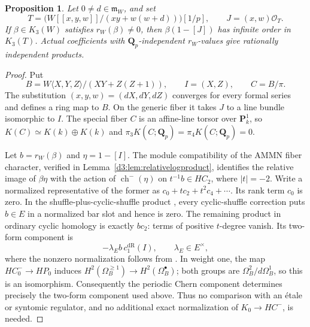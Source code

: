 \documentclass[11pt,a4paper]{amsart}
\numberwithin{equation}{section}
\newtheorem{proposition}[theorem]{Proposition}
\theoremstyle{definition}
\theoremstyle{remark}
\begin{document}
\begin{proposition}\label{d3:prop:directtccoefficientcup}
Let $0\ne d\in\mathfrak m_W$, and set
\[
 T=\bigl(W[[x,y,w]]/(xy+w(w+d))\bigr)[1/p],\qquad J=(x,w)\mathcal O_T.
\]
If $\beta\in K_3(W)$ satisfies $r_W(\beta)\ne0$, then
$\beta(1-[J])$ has infinite order in $K_3(T)$. Actual coefficients
with $\mathbf Q_p$-independent $r_W$-values give rationally independent
products.
\end{proposition}
\begin{proof}
Put
\[
 B=W\langle X,Y,Z\rangle/(XY+Z(Z+1)),\qquad I=(X,Z),\qquad C=B/\pi.
\]
The substitution $(x,y,w)=(dX,dY,dZ)$ converges for every formal
series and defines a ring map to $B$. On the generic fiber it takes
$J$ to a line bundle isomorphic to $I$. The special fiber $C$ is an
affine-line torsor over $\mathbf P^1_k$, so
$K(C)\simeq K(k)\oplus K(k)$ and
$\pi_3K(C;\mathbf Q_p)=\pi_4K(C;\mathbf Q_p)=0$.

Let $b=r_W(\beta)$ and $\eta=1-[I]$. The module compatibility of the
AMMN fiber character, verified in Lemma~\ref{d3:lem:relativelogproduct},
identifies the relative image of $\beta\eta$ with the action of
$\operatorname{ch}^{-}(\eta)$ on $t^{-1}b\in HC_2$, where $|t|=-2$.
Write a normalized representative of the former as
$c_0+tc_2+t^2c_4+\cdots$. Its rank term $c_0$ is zero. In the
shuffle-plus-cyclic-shuffle product
\cite[Section~2, Remark~2.2]{BokstedtOttosen}, every cyclic-shuffle
correction puts $b\in E$ in a normalized bar slot and hence is zero.
The remaining product in ordinary cyclic homology is exactly $bc_2$:
terms of positive $t$-degree vanish. Its two-form component is
\[
 -\lambda_E b\,c_1^{\mathrm{dR}}(I),\qquad\lambda_E\in E^\times,
\]
where the nonzero normalization follows from
\cite[Proposition~4.12]{AMMN}. In weight one, the map
$HC^-_0\to HP_0$ induces
$H^2(\Omega_B^{\geq1})\to H^2(\Omega_B^\bullet)$; both groups
are $\Omega_B^2/d\Omega_B^1$, so this is an isomorphism.
Consequently the periodic Chern component determines precisely the
two-form component used above. Thus no comparison with an \'etale
or syntomic regulator, and no additional exact normalization of
$K_0\to HC^{-}$, is needed.


\end{proof}
\end{document}
